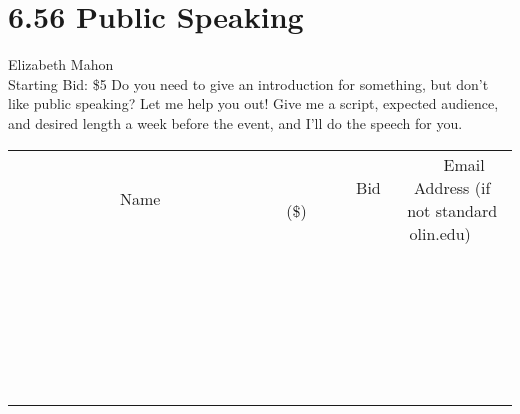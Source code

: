 \documentclass[11pt]{article}
\begin{document}
\section*{6.56 Public Speaking}
Elizabeth Mahon
\\
Starting Bid: \$5
\newline
Do you need to give an introduction for something, but don't like public speaking? Let me help you out! Give me a script, expected audience, and desired length a week before the event, and I'll do the speech for you.
\\[6ex]
\begin{tabular}{c c c}
~~~~~~~~~~~~~Name~~~~~~~~~~~~~ & ~~~~~~~~~Bid (\$)~~~~~~~~~  & ~~~Email Address (if not standard olin.edu)~~~\\
 & & \\
\hline
 & & \\
\hline
 & & \\
\hline
 & & \\
\hline
 & & \\
\hline
 & & \\
\hline
 & & \\
\hline
 & & \\
\hline
 & & \\
\hline
 & & \\
\hline
 & & \\
\hline
 & & \\
\hline
 & & \\
\hline
 & & \\
\hline
 & & \\
\hline
 & & \\
\hline
 & & \\
\hline
 & & \\
\hline
 & & \\
\hline
 & & \\
\hline
 & & \\
\hline
 & & \\
\hline
 & & \\
\hline
 & & \\
\hline
 & & \\
\hline
 & & \\
\hline
\end{tabular}
\newpage
\end{document}
